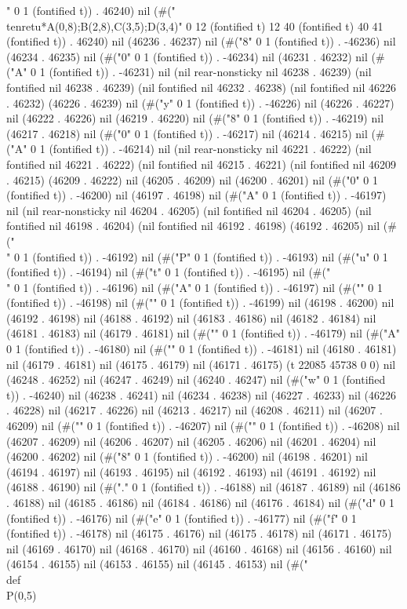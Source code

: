 " 0 1 (fontified t)) . 46240) nil (#("   \\tenretu*{A(0,8);B(2,8),C(3,5);D(3,4)}" 0 12 (fontified t) 12 40 (fontified t) 40 41 (fontified t)) . 46240) nil (46236 . 46237) nil (#("8" 0 1 (fontified t)) . -46236) nil (46234 . 46235) nil (#("0" 0 1 (fontified t)) . -46234) nil (46231 . 46232) nil (#("A" 0 1 (fontified t)) . -46231) nil (nil rear-nonsticky nil 46238 . 46239) (nil fontified nil 46238 . 46239) (nil fontified nil 46232 . 46238) (nil fontified nil 46226 . 46232) (46226 . 46239) nil (#("y" 0 1 (fontified t)) . -46226) nil (46226 . 46227) nil (46222 . 46226) nil (46219 . 46220) nil (#("8" 0 1 (fontified t)) . -46219) nil (46217 . 46218) nil (#("0" 0 1 (fontified t)) . -46217) nil (46214 . 46215) nil (#("A" 0 1 (fontified t)) . -46214) nil (nil rear-nonsticky nil 46221 . 46222) (nil fontified nil 46221 . 46222) (nil fontified nil 46215 . 46221) (nil fontified nil 46209 . 46215) (46209 . 46222) nil (46205 . 46209) nil (46200 . 46201) nil (#("0" 0 1 (fontified t)) . -46200) nil (46197 . 46198) nil (#("A" 0 1 (fontified t)) . -46197) nil (nil rear-nonsticky nil 46204 . 46205) (nil fontified nil 46204 . 46205) (nil fontified nil 46198 . 46204) (nil fontified nil 46192 . 46198) (46192 . 46205) nil (#("\\" 0 1 (fontified t)) . -46192) nil (#("P" 0 1 (fontified t)) . -46193) nil (#("u" 0 1 (fontified t)) . -46194) nil (#("t" 0 1 (fontified t)) . -46195) nil (#("\\" 0 1 (fontified t)) . -46196) nil (#("A" 0 1 (fontified t)) . -46197) nil (#("{" 0 1 (fontified t)) . -46198) nil (#("}" 0 1 (fontified t)) . -46199) nil (46198 . 46200) nil (46192 . 46198) nil (46188 . 46192) nil (46183 . 46186) nil (46182 . 46184) nil (46181 . 46183) nil (46179 . 46181) nil (#("{" 0 1 (fontified t)) . -46179) nil (#("A" 0 1 (fontified t)) . -46180) nil (#("}" 0 1 (fontified t)) . -46181) nil (46180 . 46181) nil (46179 . 46181) nil (46175 . 46179) nil (46171 . 46175) (t 22085 45738 0 0) nil (46248 . 46252) nil (46247 . 46249) nil (46240 . 46247) nil (#("w" 0 1 (fontified t)) . -46240) nil (46238 . 46241) nil (46234 . 46238) nil (46227 . 46233) nil (46226 . 46228) nil (46217 . 46226) nil (46213 . 46217) nil (46208 . 46211) nil (46207 . 46209) nil (#("{" 0 1 (fontified t)) . -46207) nil (#("}" 0 1 (fontified t)) . -46208) nil (46207 . 46209) nil (46206 . 46207) nil (46205 . 46206) nil (46201 . 46204) nil (46200 . 46202) nil (#("8" 0 1 (fontified t)) . -46200) nil (46198 . 46201) nil (46194 . 46197) nil (46193 . 46195) nil (46192 . 46193) nil (46191 . 46192) nil (46188 . 46190) nil (#("." 0 1 (fontified t)) . -46188) nil (46187 . 46189) nil (46186 . 46188) nil (46185 . 46186) nil (46184 . 46186) nil (46176 . 46184) nil (#("d" 0 1 (fontified t)) . -46176) nil (#("e" 0 1 (fontified t)) . -46177) nil (#("f" 0 1 (fontified t)) . -46178) nil (46175 . 46176) nil (46175 . 46178) nil (46171 . 46175) nil (46169 . 46170) nil (46168 . 46170) nil (46160 . 46168) nil (46156 . 46160) nil (46154 . 46155) nil (46153 . 46155) nil (46145 . 46153) nil (#("\\def\\P{(0,5)}
